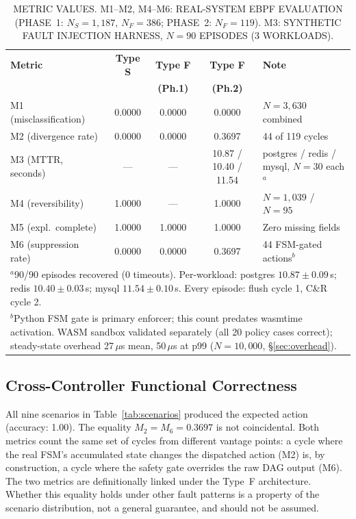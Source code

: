 \documentclass[conference]{IEEEtran}
\begin{document}
\begin{table}[!t]
\caption{METRIC VALUES. M1--M2, M4--M6: REAL-SYSTEM EBPF EVALUATION (PHASE~1: $N_S = 1{,}187$, $N_F = 386$; PHASE~2: $N_F = 119$). M3: SYNTHETIC FAULT INJECTION HARNESS, $N = 90$ EPISODES (3 WORKLOADS).}
\label{tab:metrics}
\centering
\renewcommand{\arraystretch}{1.15}
\begin{tabular}{lcccp{5.5cm}}
\hline
\textbf{Metric} & \textbf{Type S} & \textbf{Type F} & \textbf{Type F} & \textbf{Note} \\
                &                 & \textbf{(Ph.1)} & \textbf{(Ph.2)} & \\
\hline
M1 (misclassification) & 0.0000 & 0.0000 & 0.0000 & $N = 3{,}630$ combined \\
M2 (divergence rate)   & 0.0000 & 0.0000 & 0.3697 & 44 of 119 cycles \\
M3 (MTTR, seconds)     & ---    & ---    & 10.87 / 10.40 / 11.54  & postgres / redis / mysql, $N=30$ each$^{a}$ \\
M4 (reversibility)     & 1.0000 & ---    & 1.0000 & $N = 1{,}039$ / $N = 95$ \\
M5 (expl.\ complete)   & 1.0000 & 1.0000 & 1.0000 & Zero missing fields \\
M6 (suppression rate)  & 0.0000 & 0.0000 & 0.3697 & 44 FSM-gated actions$^{b}$ \\
\hline
\multicolumn{5}{l}{\footnotesize $^{a}$90/90 episodes recovered (0 timeouts). Per-workload: postgres $10.87 \pm 0.09$\,s; redis $10.40 \pm 0.03$\,s; mysql $11.54 \pm 0.10$\,s. Every episode: flush cycle 1, C\&R cycle 2.}\\
\multicolumn{5}{l}{\footnotesize $^{b}$Python FSM gate is primary enforcer; this count predates wasmtime activation. WASM sandbox validated separately (all 20 policy cases correct); steady-state overhead 27\,$\mu$s mean, 50\,$\mu$s at p99 ($N = 10{,}000$, §\ref{sec:overhead}).}
\end{tabular}
\end{table}

\subsection{Cross-Controller Functional Correctness}

All nine scenarios in Table~\ref{tab:scenarios} produced the expected action (accuracy: 1.00). The equality $M_2 = M_6 = 0.3697$ is not coincidental. Both metrics count the same set of cycles from different vantage points: a cycle where the real FSM's accumulated state changes the dispatched action (M2) is, by construction, a cycle where the safety gate overrides the raw DAG output (M6). The two metrics are definitionally linked under the Type~F architecture. Whether this equality holds under other fault patterns is a property of the scenario distribution, not a general guarantee, and should not be assumed.
\end{document}
